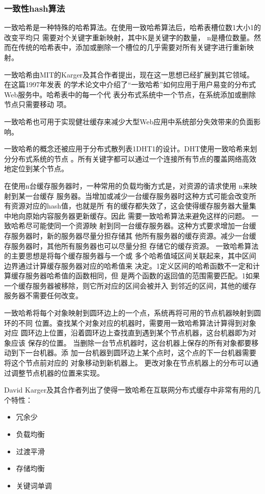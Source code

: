 \subsubsection*{一致性hash算法}
一致哈希是一种特殊的哈希算法。在使用一致哈希算法后，哈希表槽位数1大小1的改变平均只
需要对个关键字重新映射，其中K是关键字的数量， 
n是槽位数量。然而在传统的哈希表中，添加或删除一个槽位的几乎需要对所有关键字进行重新映射。

一致哈希由MIT的Karger及其合作者提出，现在这一思想已经扩展到其它领域。在这篇1997年发表
的学术论文中介绍了“一致哈希”如何应用于用户易变的分布式Web服务中。哈希表中的每一个代
表分布式系统中一个节点，在系统添加或删除节点只需要移动 项。

一致哈希也可用于实现健壮缓存来减少大型Web应用中系统部分失效带来的负面影响。

一致哈希的概念还被应用于分布式散列表1DHT1的设计。DHT使用一致哈希来划分分布式系统的节点
。所有关键字都可以通过一个连接所有节点的覆盖网络高效地定位到某个节点。

在使用n台缓存服务器时，一种常用的负载均衡方式是，对资源的请求使用 n来映射到某一台缓存
服务器。当增加或减少一台缓存服务器时这种方式可能会改变所有资源对应的hash值，也就是所
有的缓存都失效了，这会使得缓存服务器大量集中地向原始内容服务器更新缓存。因此
需要一致哈希算法来避免这样的问题。 一致哈希尽可能使同一个资源映
射到同一台缓存服务器。这种方式要求增加一台缓存服务器时，新的服务器尽量分担存储其
他所有服务器的缓存资源。减少一台缓存服务器时，其他所有服务器也可以尽量分担
存储它的缓存资源。 一致哈希算法的主要思想是将每个缓存服务器与一个或
多个哈希值域区间关联起来，其中区间边界通过计算缓存服务器对应的哈希值来
决定。1定义区间的哈希函数不一定和计算缓存服务器哈希值的函数相同，但
是两个函数的返回值的范围需要匹配。1如果一个缓存服务器被移除，则它所对应的区间会被并入
到邻近的区间，其他的缓存服务器不需要任何改变。

一致哈希将每个对象映射到圆环边上的一个点，系统再将可用的节点机器映射到圆环的不同
位置。查找某个对象对应的机器时，需要用一致哈希算法计算得到对象对应
圆环边上位置，沿着圆环边上查找直到遇到某个节点机器，这台机器即为对象应该
保存的位置。 当删除一台节点机器时，这台机器上保存的所有对象都要移动到下一台机器。添
加一台机器到圆环边上某个点时，这个点的下一台机器需要将这个节点前对应的
对象移动到新机器上。 更改对象在节点机器上的分布可以通过调整节点机器的位置来实现。

David Karger及其合作者列出了使得一致哈希在互联网分布式缓存中非常有用的几个特性：
\begin{itemize}
\item 冗余少
\item 负载均衡
\item 过渡平滑
\item 存储均衡
\item 关键词单调
\end{itemize}

